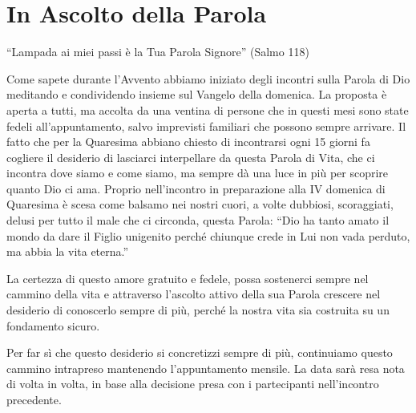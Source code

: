 \section{In Ascolto della Parola}
``Lampada ai miei passi è la Tua Parola Signore'' (Salmo 118)


Come sapete durante l’Avvento abbiamo iniziato degli incontri sulla Parola di Dio meditando e condividendo insieme sul Vangelo della domenica. La proposta è aperta a tutti, ma accolta da una ventina di persone che in questi mesi sono state fedeli all’appuntamento, salvo imprevisti familiari che possono sempre arrivare. Il fatto che per la Quaresima abbiano chiesto di incontrarsi ogni 15 giorni fa cogliere il desiderio di lasciarci interpellare da questa Parola di Vita, che ci incontra dove siamo e come siamo, ma sempre dà una luce in più per scoprire quanto Dio ci ama. Proprio nell’incontro in preparazione alla IV domenica di Quaresima è scesa come balsamo nei nostri cuori, a volte dubbiosi, scoraggiati, delusi per tutto il male che ci circonda, questa Parola: ``Dio ha tanto amato il mondo da dare il Figlio unigenito perché chiunque crede in Lui non vada perduto, ma abbia la vita eterna.''

La certezza di questo amore gratuito e fedele, possa sostenerci sempre nel cammino della vita e attraverso l’ascolto attivo della sua Parola crescere nel desiderio di conoscerlo sempre di più, perché la nostra vita sia costruita su un fondamento sicuro.

Per far sì che questo desiderio si concretizzi sempre di più, continuiamo questo cammino intrapreso mantenendo l’appuntamento mensile. La data sarà resa nota di volta in volta, in base alla decisione presa con i partecipanti nell’incontro precedente.



